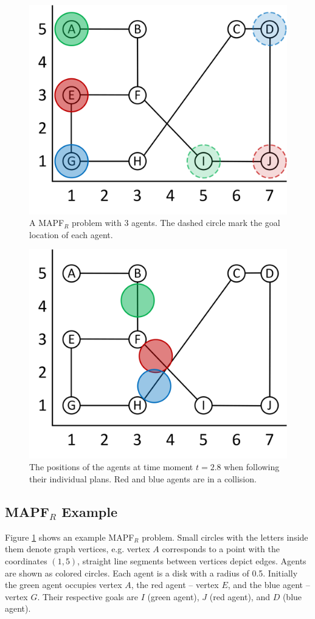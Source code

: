 \documentclass[review]{elsarticle}
\newcommand{\target}{\ensuremath{G}\xspace}
\newcommand{\source}{\ensuremath{S}\xspace}
\newcommand\konstantin[1]{\nb{\textbf{Konstantin:}}{red}{#1}}
\newcommand{\mapfr}{\ac{MAPF}$_R$\xspace}
\newcommand{\coord}{\textit{coord}\xspace}
\begin{document}


\begin{figure}
    \centering
    \includegraphics[width=0.6\columnwidth]{running_example.png}
    \caption{A \mapfr problem with 3 agents. The dashed circle mark the goal location of each agent.}
    \label{fig:example}
\end{figure}

\begin{figure}
    \centering
    \includegraphics[width=0.6\columnwidth]{running_example_t2-8.png}
    \caption{The positions of the agents at time moment $t=2.8$ when following their individual plans. Red and blue agents are in a collision.}
    \label{fig:example-t-2-8}
\end{figure}

\subsection{\mapfr Example}
Figure \ref{fig:example} shows an example \mapfr problem. 
Small circles with the letters inside them denote graph vertices, e.g. vertex $A$ corresponds to a point with the coordinates $(1, 5)$, straight line segments between vertices depict edges. %
Agents are shown as colored circles. Each agent is a disk with a radius of 0.5. Initially the green agent occupies vertex $A$, the red agent -- vertex $E$, and the blue agent -- vertex $G$. Their respective goals are $I$ (green agent), $J$ (red agent), and $D$ (blue agent).
\end{document}
